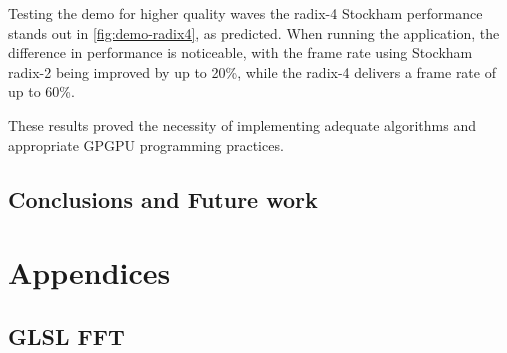 \documentclass[
  oneside,
  11pt, a4paper,
  footinclude=true,
  headinclude=true,
  cleardoublepage=empty
]{scrbook}
\begin{document}
Testing the demo for higher quality waves the radix-4 Stockham performance stands out in \autoref{fig:demo-radix4}, as predicted. When running the application, the difference in performance is noticeable, with the frame rate using Stockham radix-2 being improved by up to 20\%, while the radix-4 delivers a frame rate of up to 60\%.

These results proved the necessity of implementing adequate algorithms and appropriate GPGPU programming practices.

\chapter{Conclusions and Future work}

% 

\cleardoublepage



\printindex

    
    \appendix
    \renewcommand\chaptername{Appendix}



\part{Appendices}

\chapter{GLSL FFT} \label{apdx:glsl-fft}
\end{document}
